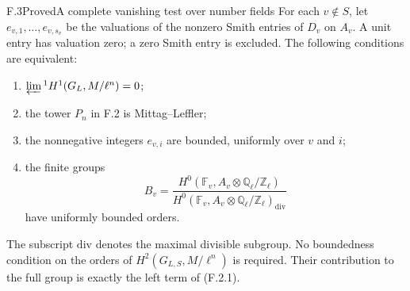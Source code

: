 \begin{statement}{F.3}{Proved}{A complete vanishing test over number fields}
For each $v\notin S$, let $e_{v,1},\ldots,e_{v,s_v}$ be the valuations of the nonzero Smith entries of $D_v$ on $A_v$. A unit entry has valuation zero; a zero Smith entry is excluded. The following conditions are equivalent:
\begin{enumerate}[label=(\roman*)]
\item $\varprojlim{}^1 H^1(G_L,M/\ell^n)=0$;
\item the tower $P_n$ in F.2 is Mittag--Leffler;
\item the nonnegative integers $e_{v,i}$ are bounded, uniformly over $v$ and $i$;
\item the finite groups
\[
 B_v=
 \frac{H^0(\mathbb F_v,A_v\otimes\mathbb Q_\ell/\mathbb Z_\ell)}
      {H^0(\mathbb F_v,A_v\otimes\mathbb Q_\ell/\mathbb Z_\ell)_{\mathrm{div}}}
\]
have uniformly bounded orders.
\end{enumerate}
The subscript $\mathrm{div}$ denotes the maximal divisible subgroup. No boundedness condition on the orders of $H^2(G_{L,S},M/\ell^n)$ is required. Their contribution to the full group is exactly the left term of (F.2.1).
\end{statement}
